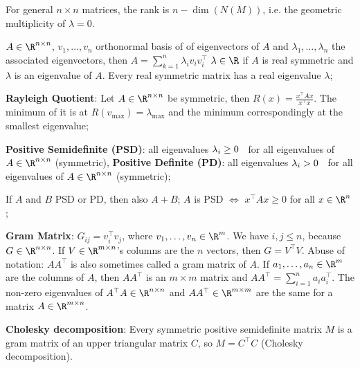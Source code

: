 For general $n \times n$ matrices, the rank is $n - \dim(N(M))$, i.e. the geometric multiplicity of $\lambda = 0$.

\setcounter{all}{6}\shortproposition $A \in \R^{n \times n}$, $v_1, \ldots, v_n$ orthonormal basis of of eigenvectors of $A$ and $\lambda_1, \ldots, \lambda_n$ the associated eigenvectors, then $A = \displaystyle\sum_{k = 1}^{n}\lambda_i v_i v_i^{\top}$
$\lambda \in \R$ if $A$ is real symmetric and $\lambda$ is an eigenvalue of $A$.
\setcounter{all}{8}\shortcorollary Every real symmetric matrix has a real eigenvalue $\lambda$;

\setcounter{all}{10}\shortproposition \textbf{Rayleigh Quotient}: Let $A\in \R^{n \times n}$ be symmetric, then $\displaystyle R(x) = \frac{x^{\top}Ax}{x^{\top}x}$. The minimum of it is at $R(v_{\max}) = \lambda_{\max}$ and the minimum correspondingly at the smallest eigenvalue;

\shortdef \textbf{Positive Semidefinite (PSD)}: all eigenvalues $\lambda_i \geq 0 \hspace{2mm}$ for all eigenvalues of $A \in \R^{n \times n}$ (symmetric),
\textbf{Positive Definite (PD)}: all eigenvalues $\lambda_i > 0 \hspace{2mm}$ for all eigenvalues of $A \in \R^{n \times n}$ (symmetric);

\setcounter{all}{13}\shortfact If $A$ and $B$ PSD or PD, then also $A + B$; $A$ is PSD $\Leftrightarrow$ $x^{\top}Ax \geq 0$ for all $x \in \R^n$;

\shortdef \textbf{Gram Matrix}: $G_{ij} = v_i^{\top}v_j$, where $v_1, \ldots, v_n \in \R^m$. We have $i, j \leq n$, because $G \in \R^{n \times n}$. If $V \in \R^{m \times n}$'s columns are the $n$ vectors, then $G = V^{\top}V$. Abuse of notation: $AA^{\top}$ is also sometimes called a gram matrix of $A$. If $a_1, \ldots, a_n \in \R^m$ are the columns of $A$, then $AA^{\top}$ is an $m \times m$ matrix and $AA^{\top} = \displaystyle\sum_{i = 1}^{n}a_ia_i^{\top}$.
\setcounter{all}{16}\shortproposition The non-zero eigenvalues of $A^{\top}A \in \R^{n \times n}$ and $AA^{\top}\in \R^{m \times m}$ are the same for a matrix $A \in \R^{m \times n}$.

\shortproposition \textbf{Cholesky decomposition}: Every symmetric positive semidefinite matrix $M$ is a gram matrix of an upper triangular matrix $C$, so $M = C^{\top}C$ (Cholesky decomposition).

